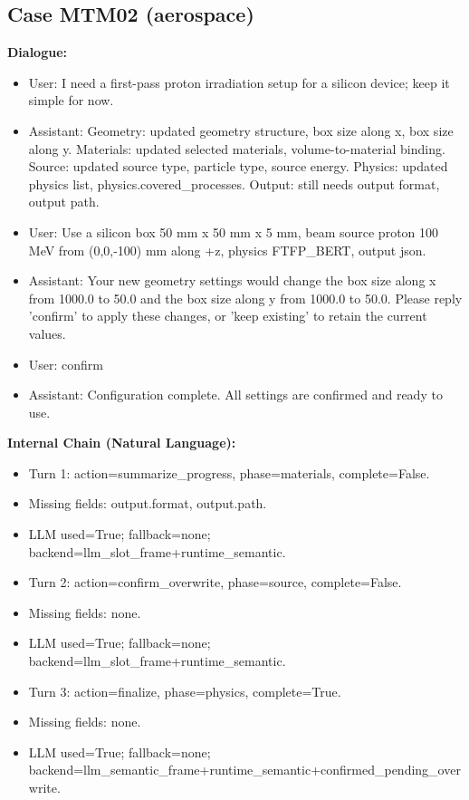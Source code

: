 \documentclass[11pt]{ctexart}
\begin{document}
\subsection{Case MTM02 (aerospace)}
\textbf{Dialogue:}
\begin{itemize}
\item User: I need a first-pass proton irradiation setup for a silicon device; keep it simple for now.
\item Assistant: Geometry: updated geometry structure, box size along x, box size along y. Materials: updated selected materials, volume-to-material binding. Source: updated source type, particle type, source energy. Physics: updated physics list, physics.covered\_processes. Output: still needs output format, output path.
\item User: Use a silicon box 50 mm x 50 mm x 5 mm, beam source proton 100 MeV from (0,0,-100) mm along +z, physics FTFP\_BERT, output json.
\item Assistant: Your new geometry settings would change the box size along x from 1000.0 to 50.0 and the box size along y from 1000.0 to 50.0. Please reply 'confirm' to apply these changes, or 'keep existing' to retain the current values.
\item User: confirm
\item Assistant: Configuration complete. All settings are confirmed and ready to use.
\end{itemize}
\textbf{Internal Chain (Natural Language):}
\begin{itemize}
\item Turn 1: action=summarize\_progress, phase=materials, complete=False.
\item Missing fields: output.format, output.path.
\item LLM used=True; fallback=none; backend=llm\_slot\_frame+runtime\_semantic.
\item Turn 2: action=confirm\_overwrite, phase=source, complete=False.
\item Missing fields: none.
\item LLM used=True; fallback=none; backend=llm\_slot\_frame+runtime\_semantic.
\item Turn 3: action=finalize, phase=physics, complete=True.
\item Missing fields: none.
\item LLM used=True; fallback=none; backend=llm\_semantic\_frame+runtime\_semantic+confirmed\_pending\_overwrite.
\end{itemize}
\end{document}
